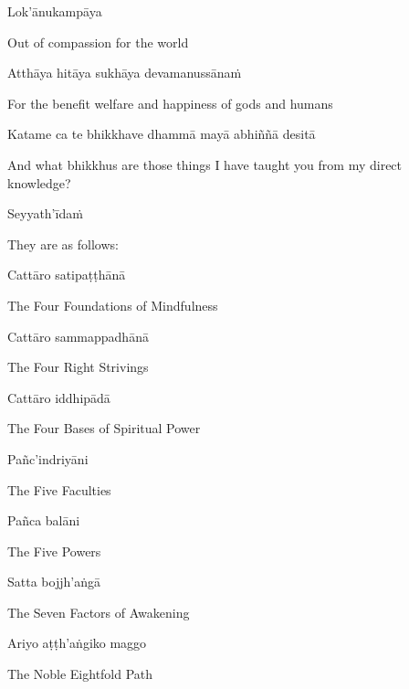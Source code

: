 Lok'ānukampāya

\begin{english}
  Out of compassion for the world
\end{english}

Atthāya hitāya sukhāya devamanussānaṁ

\begin{english}
  For the benefit welfare and happiness of gods and humans
\end{english}

Katame ca te bhikkhave dhammā mayā abhiññā desitā

\begin{english-hang}
  And what bhikkhus are those things I have taught you from my direct knowledge?
\end{english-hang}

Seyyath'īdaṁ

\begin{english}
  They are as follows:
\end{english}

Cattāro satipaṭṭhānā

\begin{english}
  The Four Foundations of Mindfulness
\end{english}

Cattāro sammappadhānā

\begin{english}
  The Four Right Strivings
\end{english}

Cattāro iddhipādā

\begin{english}
  The Four Bases of Spiritual Power
\end{english}

Pañc'indriyāni

\begin{english}
  The Five Faculties
\end{english}

Pañca balāni

\begin{english}
  The Five Powers
\end{english}

Satta bojjh'aṅgā

\begin{english}
  The Seven Factors of Awakening
\end{english}

Ariyo aṭṭh'aṅgiko maggo

\begin{english}
  The Noble Eightfold Path
\end{english}

